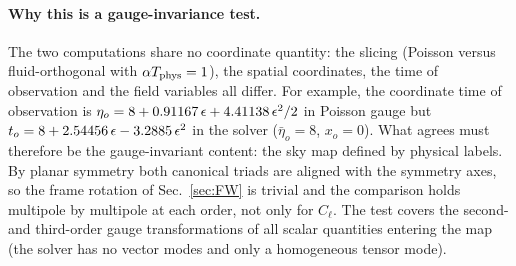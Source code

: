 \paragraph{Why this is a gauge-invariance test.}  The two computations share no coordinate quantity: the slicing (Poisson versus
fluid-orthogonal with $\alpha T_{\rm phys}=1$), the spatial coordinates, the time of observation and the field variables all differ.  For example,
the coordinate time of observation is $\eta_o=8+0.91167\,\epsilon+4.41138\,\epsilon^2/2$ in Poisson gauge but $t_o=8+2.54456\,\epsilon-3.2885\,\epsilon^2$ in the solver
($\bar\eta_o=8$, $x_o=0$).  What agrees must therefore be the gauge-invariant content: the sky map defined by physical labels.  By planar
symmetry both canonical triads are aligned with the symmetry axes, so the frame rotation of Sec.~\ref{sec:FW} is trivial and the comparison
holds multipole by multipole at each order, not only for $C_\ell$.  The test covers the second- and third-order gauge transformations of all
scalar quantities entering the map (the solver has no vector modes and only a homogeneous tensor mode).
